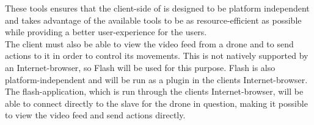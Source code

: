These tools ensures that the client-side of \projectname{} is designed to be platform independent and takes advantage of the available tools to be as resource-efficient as possible while providing a better user-experience for the users. \\

The client must also be able to view the video feed from a drone and to send actions to it in order to control its movements. 
This is not natively supported by an Internet-browser, so Flash will be used for this purpose. 
Flash is also platform-independent and will be run as a plugin in the clients Internet-browser.
The flash-application, which is run through the clients Internet-browser, will be able to connect directly to the slave for the drone in question, making it possible to view the video feed and send actions directly.

